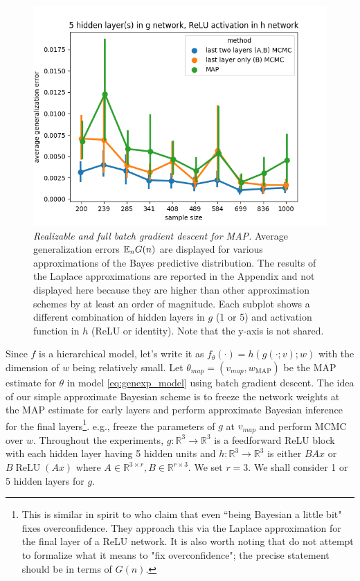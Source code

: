 \documentclass{article} %
\begin{document}
\begin{figure}[h!]
\begin{center}
		\includegraphics[scale=0.35]{taskid11.png}
	\end{center}
	\caption{\textit{Realizable and full batch gradient descent for MAP.} Average generalization errors $\mathbb{E}_n G(n)$ are displayed for various approximations of the Bayes predictive distribution. The results of the Laplace approximations are reported in the Appendix and not displayed here because they are higher than other approximation schemes by at least an order of magnitude. Each subplot shows a different combination of hidden layers in $g$ (1 or 5) and activation function in $h$ (ReLU or identity). Note that the y-axis is not shared.
	}
	\label{fig:avg_gen_err_fullbatch_realizable}
\end{figure}




 Since $f$ is a hierarchical model, let's write it as $f_\theta(\cdot) = h(g(\cdot;v);w)$ with the dimension of $w$ being relatively small. Let $\theta_{map} = (v_{map}, w_{\operatorname{MAP}})$ be the MAP estimate for $\theta$ in model \ref{eq:genexp_model} using batch gradient descent. The idea of our simple approximate Bayesian scheme is to freeze the network weights at the MAP estimate for early layers and perform approximate Bayesian inference for the final layers\footnote{This is similar in spirit to \citet{kristiadi_being_2020} who claim that even ``being Bayesian a little bit" fixes overconfidence. They approach this via the Laplace approximation for the final layer of a ReLU network. It is also worth noting that \citet{kristiadi_being_2020} do not attempt to formalize what it means to "fix overconfidence"; the precise statement should be in terms of $G(n)$.}. e.g., freeze the parameters of $g$ at $v_{map}$ and perform MCMC over $w$. 
Throughout the experiments, $g: \mathbb R^3 \to \mathbb R^3$ is a feedforward ReLU block with each hidden layer having 5 hidden units and $h: \mathbb R^3 \to \mathbb R^3$ is either $BAx$ or $B \operatorname{ReLU}(Ax)$ where $A \in \mathbb R^{3 \times r}, B \in \mathbb R^{r \times 3}$. We set $r=3$. We shall consider 1 or 5 hidden layers for $g$. 
\end{document}
